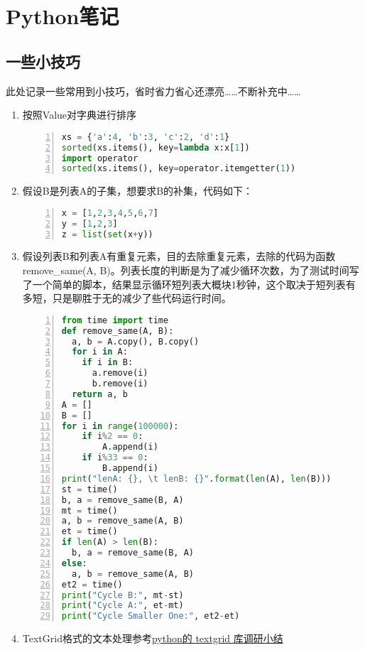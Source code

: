 \chapter{Python笔记}
\section{一些小技巧}
此处记录一些常用到小技巧，省时省力省心还漂亮……不断补充中……
\begin{enumerate}
  \item 按照Value对字典进行排序
    \begin{lstlisting}[language = python, numbers=left, 
             numberstyle=\tiny,keywordstyle=\color{blue!70},
             commentstyle=\color{red!50!green!50!blue!50},frame=shadowbox,
             rulesepcolor=\color{red!20!green!20!blue!20},basicstyle=\ttfamily]
xs = {'a':4, 'b':3, 'c':2, 'd':1}
sorted(xs.items(), key=lambda x:x[1])
import operator
sorted(xs.items(), key=operator.itemgetter(1))
    \end{lstlisting}
  \item 假设B是列表A的子集，想要求B的补集，代码如下：
    \begin{lstlisting}[language = python, numbers=left, 
             numberstyle=\tiny,keywordstyle=\color{blue!70},
             commentstyle=\color{red!50!green!50!blue!50},frame=shadowbox,
             rulesepcolor=\color{red!20!green!20!blue!20},basicstyle=\ttfamily]
x = [1,2,3,4,5,6,7]
y = [1,2,3]
z = list(set(x+y))
    \end{lstlisting}
  \item 假设列表B和列表A有重复元素，目的去除重复元素，去除的代码为函数 remove\_same(A, B)。列表长度的判断是为了减少循环次数，为了测试时间写了一个简单的脚本，结果显示循环短列表大概块1秒钟，这个取决于短列表有多短，只是聊胜于无的减少了些代码运行时间。
    \begin{lstlisting}[language = python, numbers=left, 
             numberstyle=\tiny,keywordstyle=\color{blue!70},
             commentstyle=\color{red!50!green!50!blue!50},frame=shadowbox,
             rulesepcolor=\color{red!20!green!20!blue!20},basicstyle=\ttfamily]
from time import time
def remove_same(A, B):
  a, b = A.copy(), B.copy()
  for i in A:
    if i in B:
      a.remove(i)
      b.remove(i)
  return a, b
A = []
B = []
for i in range(100000):
    if i%2 == 0:
        A.append(i)
    if i%33 == 0:
        B.append(i)
print("lenA: {}, \t lenB: {}".format(len(A), len(B)))
st = time()
b, a = remove_same(B, A)
mt = time()
a, b = remove_same(A, B)
et = time()
if len(A) > len(B):
  b, a = remove_same(B, A)
else:
  a, b = remove_same(A, B)
et2 = time()
print("Cycle B:", mt-st)
print("Cycle A:", et-mt)
print("Cycle Smaller One:", et2-et)
    \end{lstlisting}
  \item TextGrid格式的文本处理参考\href{https://blog.csdn.net/duxin_csdn/article/details/88966295}{python的 textgrid 库调研小结}
\end{enumerate}


